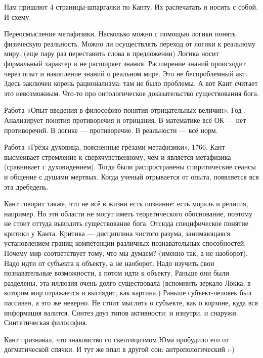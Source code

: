 Нам пришлют 4 страницы-шпаргалки по Канту. Их распечатать и носить с собой. И схему.

Переосмысление метафизики. 
Насколько можно с помощью логики понять физическую реальность. Можно ли осуществлять переход от логики к реальному миру. (еще пару раз переставить слова в предложении) 
Логика носит формальный характер и не расширяет знания. Расширение знаний происходит через опыт и накопление знаний о реальном мире.
Это не беспроблемный акт. Здесь заключен корень рационализма: там не было проблемы. А вот Кант считает это невозможным. 
Что-то про онтологическое доказательство существования бога.

Работа «Опыт введения в философию понятия отрицательных величин». Год \na. Анализирует понятия противоречия и отрицания. В математике всё ОК --- нет противоречий. В логике --- противоречие. В реальности --- всё норм.

Работа «Грёзы духовица, поясненные грёзами метафизики». 1766. Кант высмеивает стремление к сверхчувственному, чем и является метафизика (сравнивает с духовидением). 
Тогда были распространены спиритические сеансы и общение с душами мертвых. Когда ученый отрывается от опыта, появляется вся эта дребедень.

Кант говорит также, что не всё в жизни есть познание: есть мораль и религия, например. Но эти области не могут иметь теоретического обоснование, поэтому не стоит оттуда выводить существование бога. 
Отсюда специфическое понятие критики у Канта. Критика --- дисциплина чистого разума, занимающаяся установлением границ компетенции различных познавательных способностей.
Почему мир соответствует тому, что мы думаем? (именно так, а не наоборот). Надо идти от субъекта к объекту, а не наоборот. Надо изучить свои познавательные возможности, а потом идти к объекту. 
Раньше они были разделены, эта иллюзия очень долго существовала (вспомнить зеркало Локка, в котором мир отражается и выглядит, как картина.) 
Раньше субъект-человек был пассивен, а это же неверно. Не стоит мыслить о субъекте, как о корзине, куда вся информация валится. Синтез двуз типов активности: и изнутри, и снаружи. Синтетическая философия.

Кант признавал, что знакомство со скептицизмом Юма пробудило его от догматической спячки. И тут же впал в другой сон: антропологический :-)
